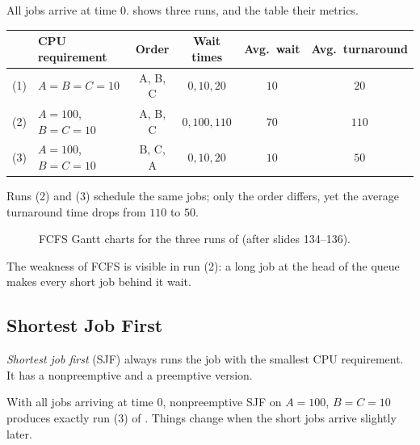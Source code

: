 \begin{example}[FCFS]
  \label{ex:fcfs}
  All jobs arrive at time $0$.  shows three runs, and the table their metrics.
  \begin{center}
  \begin{tabular}{clcccc}
    \toprule
     & CPU requirement & Order & Wait times & Avg.\ wait & Avg.\ turnaround \\
    \midrule
    (1) & $A = B = C = 10$ & A, B, C & $0, 10, 20$ & $10$ & $20$ \\
    (2) & $A = 100$, $B = C = 10$ & A, B, C & $0, 100, 110$ & $70$ & $110$ \\
    (3) & $A = 100$, $B = C = 10$ & B, C, A & $0, 10, 20$ & $10$ & $50$ \\
    \bottomrule
  \end{tabular}
  \end{center}
  Runs (2) and (3) schedule the same jobs; only the order differs, yet the average turnaround time drops from $110$ to $50$.
\end{example}

\begin{figure}[htbp]
\centering
{}
\caption{FCFS Gantt charts for the three runs of  (after slides 134--136).}
\label{fig:fcfs}
\end{figure}

The weakness of FCFS is visible in run (2): a long job at the head of the queue makes every short job behind it wait.

\subsection{Shortest Job First}

\emph{Shortest job first} (SJF) always runs the job with the smallest CPU requirement. It has a nonpreemptive and a preemptive version.

With all jobs arriving at time $0$, nonpreemptive SJF on $A = 100$, $B = C = 10$ produces exactly run (3) of . Things change when the short jobs arrive slightly later.

